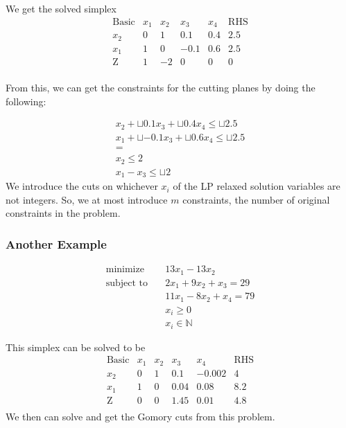 We get the solved simplex
\[
\begin{array}{c|cccc|c}
\text{Basic} & x_1 & x_2 & x_3 & x_4 & \text{RHS} \\
\hline
x_2 & 0 & 1 & 0.1 & 0.4 & 2.5 \\
x_1 & 1 & 0 & -0.1 & 0.6 & 2.5 \\
\hline
\text{Z} & 1 & -2 & 0 & 0 & 0 \\
\end{array}
\]

From this, we can get the constraints for the cutting planes by doing the following:

\begin{align}
  x_2 + \sqcup{0.1} x_3 + \sqcup{0.4} x_4 \leq \sqcup{2.5} \\
  x_1 + \sqcup{-0.1} x_3 + \sqcup{0.6} x_4 \leq \sqcup{2.5} \\
  = \\
  x_2  \leq 2 \\
  x_1 - x_3 \leq \sqcup{2}
\end{align}
We introduce the cuts on whichever $x_i$ of the LP relaxed solution variables are not integers.
So, we at most introduce $m$ constraints, the number of original constraints in the problem.

\subsubsection{Another Example}

\begin{align}
  \text{minimize} & \quad 13x_1 - 13x_2 \\
  \text{subject to} & \quad 2x_1 + 9x_2 + x_3 = 29 \\
  & \quad 11x_1 - 8x_2 + x_4 = 79 \\
  & \quad x_i \geq 0 \\
  & \quad x_i \in \mathbb{N} 
\end{align}

This simplex can be solved to be 
\[
\begin{array}{c|cccc|c}
\text{Basic} & x_1 & x_2 & x_3 & x_4 & \text{RHS} \\
\hline
x_2 & 0 & 1 & 0.1 & -0.002 & 4 \\
x_1 & 1 & 0 & 0.04 & 0.08 & 8.2 \\
\hline
\text{Z} & 0 & 0 & 1.45 & 0.01 & 4.8 \\
\end{array}
\]
We then can solve and get the Gomory cuts from this problem.


